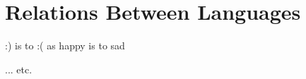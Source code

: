 \section{Relations Between Languages}
\label{sec:relations}

:) is to :( as happy is to sad

... etc.